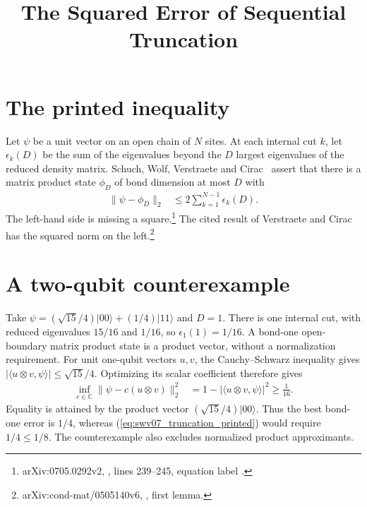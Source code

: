 \documentclass{article}
\title{The Squared Error of Sequential Truncation}
\author{}
\date{}
\begin{document}
\maketitle
{}

\section{The printed inequality}

Let $\psi$ be a unit vector on an open chain of $N$ sites. At each internal
cut $k$, let $\epsilon_k(D)$ be the sum of the eigenvalues beyond the $D$
largest eigenvalues of the reduced density matrix.
Schuch, Wolf, Verstraete and Cirac~\cite{Schuch2008EntropyScaling} assert
that there is a matrix product state $\phi_D$ of bond dimension at most $D$
with
\begin{align}
    \|\psi-\phi_D\|_2 &\le 2\sum_{k=1}^{N-1}\epsilon_k(D).
    \label{eq:swv07_truncation_printed}
\end{align}
The left-hand side is missing a square.\footnote{arXiv:0705.0292v2,
    , lines 239--245, equation label .}
The cited result of Verstraete and Cirac~\cite[Lemma~1]{VerstraeteCirac2006Faithfully}
has the squared norm on the left.\footnote{arXiv:cond-mat/0505140v6,
    , first lemma.}

\section{A two-qubit counterexample}

Take $\psi=(\sqrt{15}/4)|00\rangle+(1/4)|11\rangle$ and $D=1$.
There is one internal cut, with reduced eigenvalues $15/16$ and $1/16$,
so $\epsilon_1(1)=1/16$. A bond-one open-boundary matrix product state is
a product vector, without a normalization requirement.
For unit one-qubit vectors $u,v$, the Cauchy--Schwarz inequality gives
$|\langle u\otimes v,\psi\rangle|\le\sqrt{15}/4$.
Optimizing its scalar coefficient therefore gives
\begin{align}
    \inf_{c\in\mathbb C}\|\psi-c(u\otimes v)\|_2^2
    &=1-|\langle u\otimes v,\psi\rangle|^2\ge\frac1{16}.
    \label{eq:swv07_truncation_product}
\end{align}
Equality is attained by the product vector $(\sqrt{15}/4)|00\rangle$.
Thus the best bond-one error is $1/4$, whereas
(\ref{eq:swv07_truncation_printed}) would require $1/4\le1/8$.
The counterexample also excludes normalized product approximants.
\end{document}
